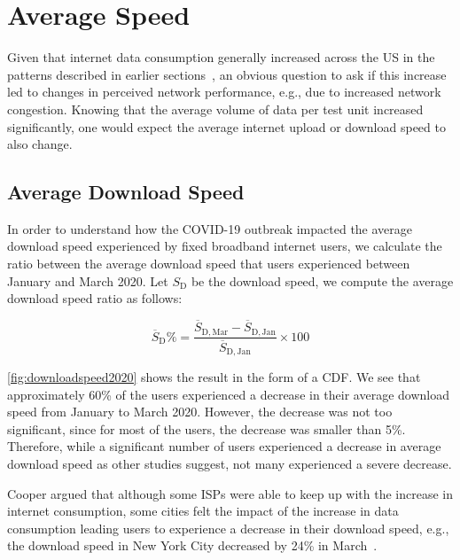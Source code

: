 \documentclass[conference,10pt]{IEEEtran}
\begin{document}
\section{Average Speed}\label{sec:average-speed}

Given that internet data consumption generally increased across the \gls{US} in the patterns described in earlier sections~\cite{feldmann2020lockdown,liu2020characterizing}, an obvious question to ask if this increase led to changes in perceived network performance, e.g., due to increased network congestion. Knowing that the average volume of data per test unit increased significantly, one would expect the average internet upload or download speed to also change.

\subsection{Average Download Speed}\label{sec:average-download-speed}

In order to understand how the COVID-19 outbreak impacted the average download speed experienced by fixed broadband internet users, we calculate the ratio between the average download speed that users experienced between January and March 2020. Let $S_{\text{D}}$ be the download speed, we compute the average download speed ratio as follows:

\begin{equation}
\overline{S}_{\text{D}}\% = \frac{\overline{S}_{\text{D},\, \text{Mar}}-\overline{S}_{\text{D},\, \text{Jan}}}{\overline{S}_{\text{D},\, \text{Jan}}}\times 100
\end{equation}


\cref{fig:downloadspeed2020} shows the result in the form of a \gls{CDF}. We see that approximately 60\% of the users experienced a decrease in their average download speed from January to March 2020. However, the decrease was not too significant, since for most of the users, the decrease was smaller than 5\%. Therefore, while a significant number of users experienced a decrease in average download speed as other studies suggest, not many experienced a severe decrease.

Cooper argued that although some \glspl{ISP} were able to keep up with the increase in internet consumption, some cities felt the impact of the increase in data consumption leading users to experience a decrease in their download speed, e.g., the download speed in New York City decreased by 24\% in March~\cite{cooper}.
\end{document}

